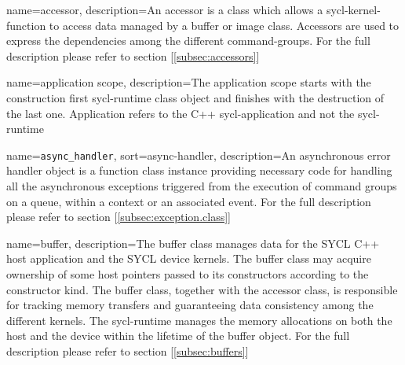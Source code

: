 



\makenoidxglossaries
\glstoctrue
{}
{
  name=accessor,
  description={An accessor is a class which allows a
               \gls{sycl-kernel-function} to access data managed by a \gls{buffer} or
               \gls{image} class. Accessors are used to express the dependencies
               among the different \glspl{command-group}. For the full
               description please refer to section [\ref{subsec:accessors}]}
}

{
  name={application scope},
  description={The application scope starts with the
               construction first \gls{sycl-runtime} class object and
               finishes with the destruction of the last one.
               Application refers to the C++ \gls{sycl-application} and not
               the \gls{sycl-runtime}}
}

{
  name={\texttt{async\_handler}},
  sort=async-handler,
  description={An asynchronous error handler object is a function class instance
               providing necessary code for handling all the asynchronous
               exceptions triggered from the execution of command groups on a
               queue, within a context or an associated event. For the full
               description please refer to section [\ref{subsec:exception.class}]}
}

{
  name=buffer,
  description={The buffer class manages data for the SYCL C++ host
               application and the SYCL device kernels. The buffer class
               may acquire ownership of some host pointers passed to its
               constructors according to the constructor kind.
               \glspar
               The buffer class, together with the accessor class,
               is responsible for tracking memory transfers and guaranteeing
               data consistency among the different kernels.
               The \gls{sycl-runtime} manages the memory allocations
               on both the host and the \gls{device} within the
               lifetime of the buffer object. For the full
               description please refer to section [\ref{subsec:buffers}]}
}

